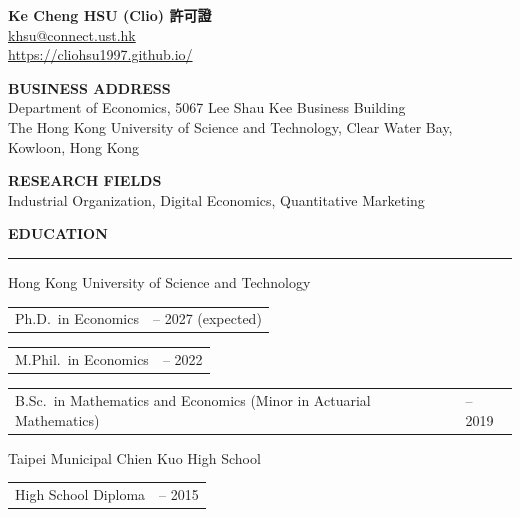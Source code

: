 \documentclass[11pt,letterpaper]{article}
\makeatletter
\newlength{\cvdatecol}
\newcommand{\sectionheader}[1]{%
  \vspace{0.55em}
  {\large\bfseries #1}\\[-0.15em]
  \rule{\textwidth}{0.4pt}\par
  \vspace{0.25em}
}
\newcommand{\cvline}[3][0em]{%
  \par\nobreak
  \noindent\hspace*{#1}%
  \begin{tabularx}{\dimexpr\textwidth-#1\relax}{@{}X@{\hspace{0.75em}}>{\raggedleft\arraybackslash}p{\cvdatecol}@{}}
  #2 & #3 \\
  \end{tabularx}%
}
\makeatother
\begin{document}
\begin{center}
{\LARGE\bfseries Ke Cheng HSU (Clio) 許可證}\\[0.55em]
\href{mailto:khsu@connect.ust.hk}{khsu@connect.ust.hk}\\[0.2em]
\href{https://cliohsu1997.github.io}{https://cliohsu1997.github.io/}
\end{center}

\vspace{0.7em}

\textbf{BUSINESS ADDRESS}\\[0.2em]
\hspace{1.5em} Department of Economics, 5067 Lee Shau Kee Business Building\\
\hspace{1.5em} The Hong Kong University of Science and Technology, Clear Water Bay, Kowloon, Hong Kong

\vspace{0.55em}

\textbf{RESEARCH FIELDS}\\[0.2em]
\hspace{1.5em} Industrial Organization, Digital Economics, Quantitative Marketing

\sectionheader{EDUCATION}
{
Hong Kong University of Science and Technology\\[-0.35em]
\cvline[1.5em]{Ph.D.\ in Economics}{2022 -- 2027 (expected)}
\vspace{-0.15em}
\cvline[1.5em]{M.Phil.\ in Economics}{2020 -- 2022}
\vspace{-0.15em}
\cvline[1.5em]{B.Sc.\ in Mathematics and Economics (Minor in Actuarial Mathematics)}{2015 -- 2019}
\par\addvspace{1.1em}%
\noindent Taipei Municipal Chien Kuo High School\\[-0.35em]
\cvline[1.5em]{High School Diploma}{2012 -- 2015}
}
\end{document}
